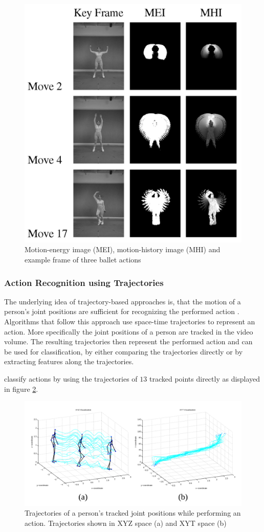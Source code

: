 \begin{figure}[h]
    \centering
    \includegraphics[width=.55\textwidth]{img_conventional/spacetimevolumes_meimhi}
    \caption{Motion-energy image (MEI), motion-history image (MHI) and example frame of three ballet actions \cite{bobick_recognition_2001}}
    \label{fig:spacetimevolumes_meimhi}
\end{figure}


\subsubsection{Action Recognition using Trajectories}
The underlying idea of trajectory-based approaches is, that the motion of a person's joint positions are sufficient for recognizing the performed action \cite{johansson_visual_1975}.
Algorithms that follow this approach use space-time trajectories to represent an action.
More specifically the joint positions of a person are tracked in the video volume.
The resulting trajectories then represent the performed action and can be used for classification, by either comparing the trajectories directly or by extracting features along the trajectories.

\textcite{sheikh_exploring_2005} classify actions by using the trajectories of $13$ tracked points directly as displayed in figure \ref{fig:trajectories_sheikh}.

\begin{figure}[H]
    \centering
    \includegraphics[width=\textwidth]{img_conventional/trajectories_sheikh}
    \caption{Trajectories of a person's tracked joint positions while performing an action. Trajectories shown in XYZ space (a) and XYT space (b) \cite{sheikh_exploring_2005}}
    \label{fig:trajectories_sheikh}
\end{figure}


